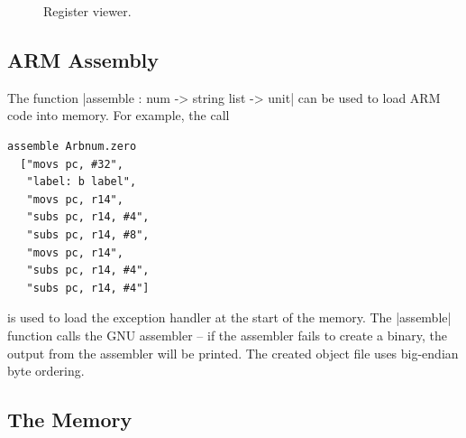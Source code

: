 \documentclass[12pt]{article}
\begin{document}
\begin{figure}
\begin{center}
\caption{Register viewer.}
\label{reg:fig}
\end{center}
\end{figure}

\subsection*{ARM Assembly}

The function |assemble : num -> string list -> unit| can be used to load ARM code into memory.  For example, the call
\begin{Verbatim}
assemble Arbnum.zero
  ["movs pc, #32",
   "label: b label",
   "movs pc, r14",
   "subs pc, r14, #4",
   "subs pc, r14, #8",
   "movs pc, r14",
   "subs pc, r14, #4",
   "subs pc, r14, #4"]
\end{Verbatim}
is used to load the exception handler at the start of the memory.  The |assemble| function calls the GNU assembler -- if the assembler fails to create a binary, the output from the assembler will be printed.  The created object file uses big-endian byte ordering.

\subsection*{The Memory}
\end{document}
